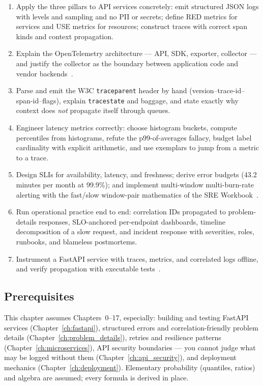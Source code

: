 \begin{enumerate}[label=\textbf{LO-\arabic*.}, leftmargin=2.6cm]
  \item Apply the three pillars to API services concretely: emit structured
        JSON logs with levels and sampling and no PII or secrets; define RED
        metrics for services and USE metrics for resources; construct traces
        with correct span kinds and context propagation.
  \item Explain the OpenTelemetry architecture --- API, SDK, exporter,
        collector --- and justify the collector as the boundary between
        application code and vendor backends~\cite{opentelemetrydocs}.
  \item Parse and emit the W3C \texttt{traceparent} header by hand
        (version--trace-id--span-id--flags), explain \texttt{tracestate}
        and baggage, and state exactly why context does \emph{not} propagate
        itself through queues.
  \item Engineer latency metrics correctly: choose histogram buckets,
        compute percentiles from histograms, refute the p99-of-averages
        fallacy, budget label cardinality with explicit arithmetic, and use
        exemplars to jump from a metric to a trace.
  \item Design SLIs for availability, latency, and freshness; derive error
        budgets (43.2 minutes per month at 99.9\%); and implement
        multi-window multi-burn-rate alerting with the fast/slow window-pair
        mathematics of the SRE Workbook~\cite{beyer2016sre}.
  \item Run operational practice end to end: correlation IDs propagated to
        problem-details responses, SLO-anchored per-endpoint dashboards,
        timeline decomposition of a slow request, and incident response with
        severities, roles, runbooks, and blameless postmortems.
  \item Instrument a FastAPI service with traces, metrics, and correlated
        logs offline, and verify propagation with executable
        tests~\cite{fastapidocs}.
\end{enumerate}

\subsection*{Prerequisites}
This chapter assumes Chapters~0--17, especially: building and testing
FastAPI services (Chapter~\ref{ch:fastapi}), structured errors and
correlation-friendly problem details (Chapter~\ref{ch:problem_details}),
retries and resilience patterns (Chapter~\ref{ch:microservices}), API
security boundaries --- you cannot judge what may be logged without them
(Chapter~\ref{ch:api_security}), and deployment mechanics
(Chapter~\ref{ch:deployment}). Elementary probability (quantiles, ratios)
and algebra are assumed; every formula is derived in place.

